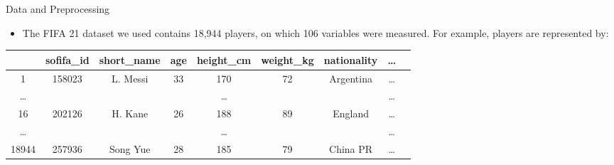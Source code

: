 \documentclass[aspectratio=169,xcolor=dvipsnames]{beamer}
\begin{document}
\begin{frame}{Data and Preprocessing}
\begin{itemize}

    \item The FIFA 21 dataset we used contains 18,944 players, on which 106 variables were measured. For example, players are represented by:
\end{itemize}
\begin{small}
\begin{table} [ht]
\centering
\begin{tabular}{ccccccccc} 
  \hline
    & sofifa\_id & short\_name & age & height\_cm & weight\_kg & nationality & \dots \\
    \hline
    1 & 158023 & L. Messi &  33 & 170 &  72 & Argentina & \dots\\ 
    \dots & &  &  & \dots &  & & \dots \\ 
    16 & 202126 & H. Kane & 26 & 188 &  89 & England & \dots\\ 
    \dots & &  &  & \dots &  & & \dots \\ 
    18944 & 257936 & Song Yue & 28 & 185 & 79 & China PR & \dots\\
    \hline
\end{tabular}
\end{table}
\end{small}
\end{frame}

\end{document}
